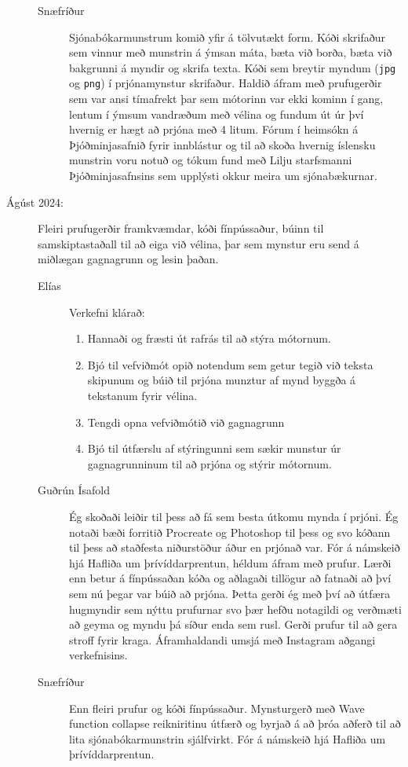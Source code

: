 \documentclass[a4paper,12pt,twoside]{article}
\begin{document}
\begin{description}
\begin{description}
        \item[Snæfríður] Sjónabókarmunstrum komið yfir á tölvutækt form. Kóði skrifaður sem vinnur með munstrin á ýmsan máta, bæta við borða, bæta við bakgrunni á myndir og skrifa texta. Kóði sem breytir myndum (\texttt{jpg} og \texttt{png}) í prjónamynstur skrifaður. Haldið áfram með prufugerðir sem var ansi tímafrekt þar sem mótorinn var ekki kominn í gang, lentum í ýmsum vandræðum með vélina og fundum út úr því hvernig er hægt að prjóna með 4 litum. Fórum í heimsókn á Þjóðminjasafnið fyrir innblástur og til að skoða hvernig íslensku munstrin voru notuð og tókum fund með Lilju starfsmanni Þjóðminjasafnsins sem upplýsti okkur meira um sjónabækurnar.
    \end{description}
    \item[Ágúst 2024:] Fleiri prufugerðir framkvæmdar, kóði fínpússaður, búinn til samskiptastaðall til að eiga við vélina, þar sem mynstur eru send á miðlægan gagnagrunn og lesin þaðan.
    \begin{description}
        \item[Elías] Verkefni klárað:
        \begin{enumerate}
            \item Hannaði og fræsti út rafrás til að stýra mótornum.
            \item Bjó til vefviðmót opið notendum sem getur tegið við teksta skipunum og búið til prjóna munztur af mynd byggða á tekstanum fyrir vélina. 
            \item Tengdi opna vefviðmótið við gagnagrunn
            \item Bjó til útfærslu af stýringunni sem sækir munstur úr gagnagrunninum til að prjóna og stýrir mótornum.
        \end{enumerate}
        \item[Guðrún Ísafold] Ég skoðaði leiðir til þess að fá sem besta útkomu mynda í prjóni. Ég notaði bæði forritið Procreate og Photoshop til þess og svo kóðann til þess að staðfesta niðurstöður áður en prjónað var. Fór á námskeið hjá Hafliða um þrívíddarprentun, héldum áfram með prufur. Lærði enn betur á fínpússaðan kóða og aðlagaði tillögur að fatnaði að því sem nú þegar var búið að prjóna. Þetta gerði ég með því að útfæra hugmyndir sem nýttu prufurnar svo þær hefðu notagildi og verðmæti að geyma og myndu þá síður enda sem rusl. Gerði prufur til að gera stroff fyrir kraga. Áframhaldandi umsjá með Instagram aðgangi verkefnisins.
       \item[Snæfríður] Enn fleiri prufur og kóði fínpússaður. Mynsturgerð með Wave function collapse reikniritinu útfærð og byrjað á að þróa aðferð til að lita sjónabókarmunstrin sjálfvirkt. Fór á námskeið hjá Hafliða um þrívíddarprentun.

\end{description}
\end{description}
\end{document}
